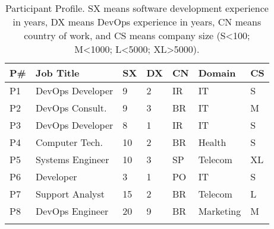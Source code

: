 \begin{table}[t]
\centering
\caption{Participant Profile. SX means software development experience in years,
DX means DevOps experience in years, CN means country of work, and CS means
company size (S\textless100; M\textless1000; L\textless5000; XL\textgreater5000).}
\label{participant_table}
\begin{tabular}{p{0.4cm}p{2.6cm}p{0.4cm}p{0.45cm}p{0.5cm}p{1.3cm}p{0.3cm}} \toprule \centering
\textbf{P\#}          & \textbf{Job Title}
       & \textbf{SX} & \textbf{DX} & \textbf{CN}   & \textbf{Domain}    & \multicolumn{1}{l}{\textbf{CS}} \\ \midrule \centering
P1                   & DevOps Developer      & 9            & 2           & IR            & IT                 & S                               \\ \centering

P2                   & DevOps Consult.       & 9            & 3           & BR            & IT                 & M                               \\ \centering

P3                   & DevOps Developer      & 8            & 1           & IR            & IT                 & S                               \\ \centering

P4                   & Computer Tech.        & 10           & 2           & BR            & Health             & S                               \\ \centering

P5                   & Systems Engineer      & 10           & 3           & SP            & Telecom            & XL                              \\ \centering

P6                   & Developer             & 3            & 1           & PO            & IT                 & S                               \\ \centering

P7                   & Support Analyst       & 15           & 2           & BR            & Telecom            & L                               \\ \centering

P8                   & DevOps Engineer       & 20           & 9           & BR            & Marketing              & M                               \\ \centering


\end{tabular}
\end{table}
